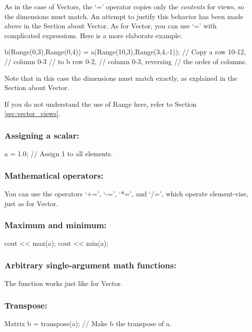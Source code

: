 As in the case of Vectors, the `=' operator copies only the
\emph{contents} for views, so the dimensions must match. An attempt to justify
this behavior has been made above in the Section about Vector. As for
Vector, you can use `=' with complicated expressions. Here is a more
elaborate example:

\begin{code}
b(Range(0,3),Range(0,4)) =
   a(Range(10,3),Range(3,4,-1)); // Copy a row 10-12,
                                 // column 0-3
                                 // to b row 0-2,
                                 // column 0-3, reversing
                                 // the order of columns.
\end{code}
Note that in this case the dimensions must match exactly, as explained
in the Section about Vector.

If you do not understand the use of Range here, refer to Section
\ref{sec:vector_views}. 

\subsubsection{Assigning a scalar:}
\begin{code}
a = 1.0;                        // Assign 1 to all elements.
\end{code}

\subsubsection{Mathematical operators:}

You can use the operators `+=', `-=', `*=', and `/=', which operate
element-vise, just as for Vector.

\subsubsection{Maximum and minimum:}
\begin{code}
cout << max(a);
cout << min(a);
\end{code}

\subsubsection{Arbitrary single-argument math functions:}

The function  works just like for Vector.

\subsubsection{Transpose:}
\begin{code}
Matrix b = transpose(a); // Make b the transpose of a.
\end{code}

